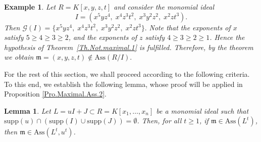 \documentclass[11pt]{amsart}
\newtheorem{lemma}[theorem]{Lemma}
\newtheorem{example}[theorem]{Example}
\begin{document}

\begin{example} \label{Exam.Not.maximal.1}
\em{
Let $R = K[x,y,z,t]$ and consider the monomial ideal
\[
I = (x^5y z^4 ,\; x^4 z^3 t^2,\; x^3  y^2 z^2,\; x^2 z t^3).
\]
Then $\mathcal{G}(I) = \{x^5y z^4 ,\; x^4 z^3 t^2,\; x^3  y^2 z^2,\; x^2 z t^3\}.$ 
Note that the exponents of $x$ satisfy $5 \geq 4 \geq 3 \geq 2$, and the exponents of $z$ satisfy $4 \geq 3 \geq 2 \geq 1$. 
Hence the hypothesis of Theorem~\ref{Th.Not.maximal.1} is fulfilled. Therefore, by the theorem we obtain
 $\mathfrak{m} = (x,y,z,t) \notin \mathrm{Ass}(R/I).$
 }
\end{example}



For the rest of this section, we shall proceed according to the following criteria. To this end, we establish the following lemma, whose proof 
will be applied in Proposition  \ref{Pro.Maximal.Ass.2}.

 
\begin{lemma}\label{Lem.Maximal.Ass.1}
Let $L=uI+J \subset R=K[x_1, \ldots, x_n]$ be a monomial ideal such that $\mathrm{supp}(u) \cap (\mathrm{supp}(I) \cup \mathrm{supp}(J))=\emptyset$. 
Then, for all $t\geq 1$,  if $\mathfrak{m}\in \mathrm{Ass}(L^t)$, then  $\mathfrak{m}\in \mathrm{Ass}(L^t,u^t)$. 
\end{lemma}
\end{document}
